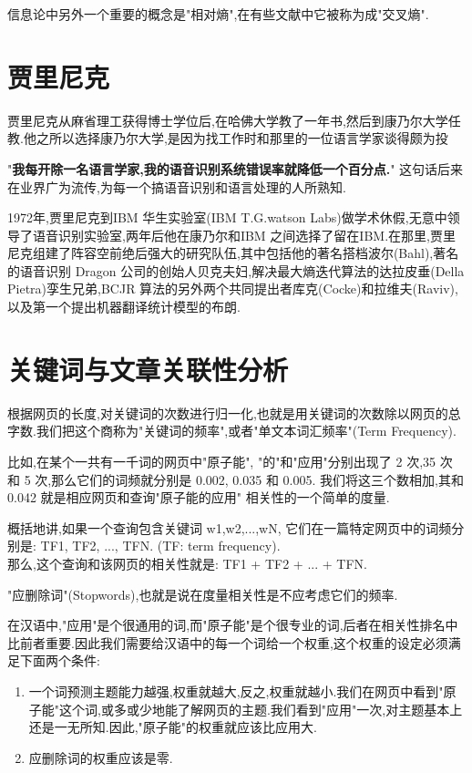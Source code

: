 \documentclass{article}
\begin{document}
信息论中另外一个重要的概念是"相对熵",在有些文献中它被称为成"交叉熵".

\section{贾里尼克}
贾里尼克从麻省理工获得博士学位后,在哈佛大学教了一年书,然后到康乃尔大学任教.他之所以选择康乃尔大学,是因为找工作时和那里的一位语言学家谈得颇为投

"\textbf{我每开除一名语言学家,我的语音识别系统错误率就降低一个百分点.}" 这句话后来在业界广为流传,为每一个搞语音识别和语言处理的人所熟知.

1972年,贾里尼克到IBM 华生实验室(IBM T.G.watson Labs)做学术休假,无意中领导了语音识别实验室,两年后他在康乃尔和IBM 之间选择了留在IBM.在那里,贾里尼克组建了阵容空前绝后强大的研究队伍,其中包括他的著名搭档波尔(Bahl),著名的语音识别 Dragon 公司的创始人贝克夫妇,解决最大熵迭代算法的达拉皮垂(Della Pietra)孪生兄弟,BCJR 算法的另外两个共同提出者库克(Cocke)和拉维夫(Raviv),以及第一个提出机器翻译统计模型的布朗.

\section{关键词与文章关联性分析}
根据网页的长度,对关键词的次数进行归一化,也就是用关键词的次数除以网页的总字数.我们把这个商称为"关键词的频率",或者"单文本词汇频率"(Term Frequency).

比如,在某个一共有一千词的网页中"原子能", "的"和"应用"分别出现了 2 次,35 次 和 5 次,那么它们的词频就分别是 0.002, 0.035 和 0.005. 
我们将这三个数相加,其和 0.042 就是相应网页和查询"原子能的应用" 相关性的一个简单的度量.

概括地讲,如果一个查询包含关键词 w1,w2,...,wN, 它们在一篇特定网页中的词频分别是: TF1, TF2, ..., TFN. (TF: term frequency).\\
那么,这个查询和该网页的相关性就是: TF1 + TF2 + ... + TFN.

"应删除词"(Stopwords),也就是说在度量相关性是不应考虑它们的频率.

在汉语中,"应用"是个很通用的词,而"原子能"是个很专业的词,后者在相关性排名中比前者重要.因此我们需要给汉语中的每一个词给一个权重,这个权重的设定必须满足下面两个条件: 
\begin{enumerate}
\item 一个词预测主题能力越强,权重就越大,反之,权重就越小.我们在网页中看到"原子能"这个词,或多或少地能了解网页的主题.我们看到"应用"一次,对主题基本上还是一无所知.因此,"原子能"的权重就应该比应用大.

\item 应删除词的权重应该是零.
\end{enumerate}
\end{document}
